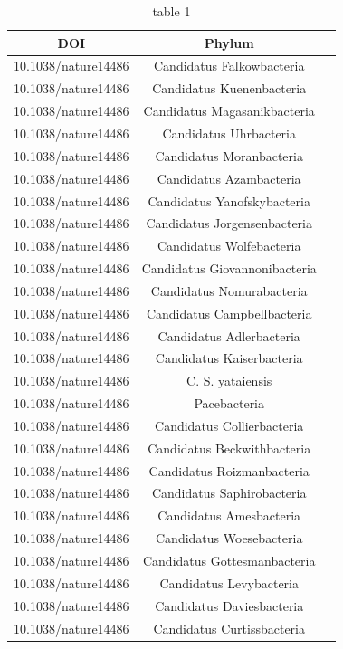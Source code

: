 \documentclass[12pt, a4paper]{report}
\begin{document}
\begin{center}
\begin{longtable}{ccc}
\caption{table 1}\\
\hline
  DOI&Phylum\\
\hline
10.1038/nature14486	&	Candidatus Falkowbacteria	\\
10.1038/nature14486	&	Candidatus Kuenenbacteria	\\
10.1038/nature14486	&	Candidatus Magasanikbacteria	\\
10.1038/nature14486	&	Candidatus Uhrbacteria	\\
10.1038/nature14486	&	Candidatus Moranbacteria	\\
10.1038/nature14486	&	Candidatus Azambacteria	\\
10.1038/nature14486	&	Candidatus Yanofskybacteria	\\
10.1038/nature14486	&	Candidatus Jorgensenbacteria	\\
10.1038/nature14486	&	Candidatus Wolfebacteria	\\
10.1038/nature14486	&	Candidatus Giovannonibacteria	\\
10.1038/nature14486	&	Candidatus Nomurabacteria	\\
10.1038/nature14486	&	Candidatus Campbellbacteria	\\
10.1038/nature14486	&	Candidatus Adlerbacteria	\\
10.1038/nature14486	&	Candidatus Kaiserbacteria	\\
10.1038/nature14486	&	C. S. yataiensis	\\
10.1038/nature14486	&	Pacebacteria	\\
10.1038/nature14486	&	Candidatus Collierbacteria	\\
10.1038/nature14486	&	Candidatus Beckwithbacteria	\\
10.1038/nature14486	&	Candidatus Roizmanbacteria	\\
10.1038/nature14486	&	Candidatus Saphirobacteria	\\
10.1038/nature14486	&	Candidatus Amesbacteria	\\
10.1038/nature14486	&	Candidatus Woesebacteria	\\
10.1038/nature14486	&	Candidatus Gottesmanbacteria	\\
10.1038/nature14486	&	Candidatus Levybacteria	\\
10.1038/nature14486	&	Candidatus Daviesbacteria	\\
10.1038/nature14486	&	Candidatus Curtissbacteria	\\

\end{longtable}
\end{center}
\end{document}
